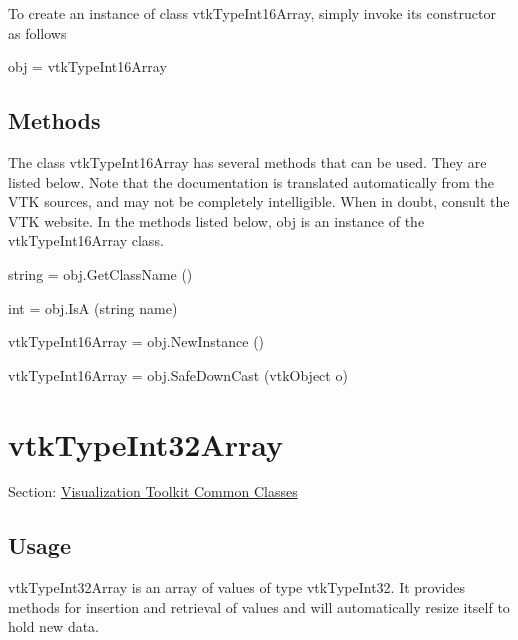 To create an instance of class vtk\-Type\-Int16\-Array, simply invoke its constructor as follows \begin{DoxyVerb}  obj = vtkTypeInt16Array
\end{DoxyVerb}
 \hypertarget{vtkwidgets_vtkxyplotwidget_Methods}{}\subsection{Methods}\label{vtkwidgets_vtkxyplotwidget_Methods}
The class vtk\-Type\-Int16\-Array has several methods that can be used. They are listed below. Note that the documentation is translated automatically from the V\-T\-K sources, and may not be completely intelligible. When in doubt, consult the V\-T\-K website. In the methods listed below, {\ttfamily obj} is an instance of the vtk\-Type\-Int16\-Array class. 
\begin{DoxyItemize}
\item {\ttfamily string = obj.\-Get\-Class\-Name ()}  
\item {\ttfamily int = obj.\-Is\-A (string name)}  
\item {\ttfamily vtk\-Type\-Int16\-Array = obj.\-New\-Instance ()}  
\item {\ttfamily vtk\-Type\-Int16\-Array = obj.\-Safe\-Down\-Cast (vtk\-Object o)}  
\end{DoxyItemize}\hypertarget{vtkcommon_vtktypeint32array}{}\section{vtk\-Type\-Int32\-Array}\label{vtkcommon_vtktypeint32array}
Section\-: \hyperlink{sec_vtkcommon}{Visualization Toolkit Common Classes} \hypertarget{vtkwidgets_vtkxyplotwidget_Usage}{}\subsection{Usage}\label{vtkwidgets_vtkxyplotwidget_Usage}
vtk\-Type\-Int32\-Array is an array of values of type vtk\-Type\-Int32. It provides methods for insertion and retrieval of values and will automatically resize itself to hold new data.

